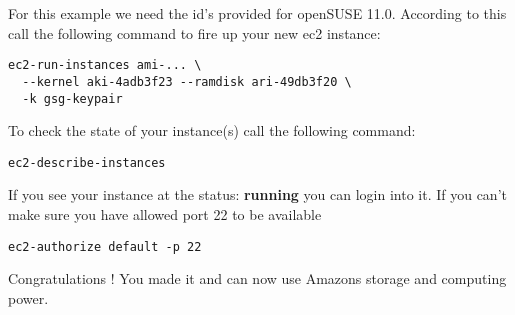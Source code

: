 For this example we need the id's provided for openSUSE 11.0. According
to this call the following command to fire up your new ec2 instance:

\begin{Command}{13cm}
\begin{verbatim}
ec2-run-instances ami-... \
  --kernel aki-4adb3f23 --ramdisk ari-49db3f20 \
  -k gsg-keypair
\end{verbatim}
\end{Command}

To check the state of your instance(s) call the following command:

\begin{Command}{10cm}
\begin{verbatim}
ec2-describe-instances
\end{verbatim}
\end{Command}

If you see your instance at the status: \textbf{running} you can login
into it. If you can't make sure you have allowed port 22 to be available

\begin{Command}{10cm}
\begin{verbatim}
ec2-authorize default -p 22
\end{verbatim}
\end{Command}

Congratulations ! You made it and can now use Amazons storage and
computing power.

